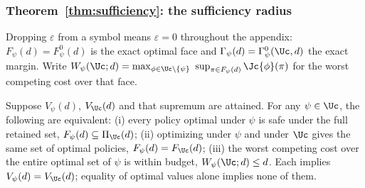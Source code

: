 
\subsubsection*{Theorem~\ref{thm:sufficiency}: the sufficiency radius}
\label{app:proof-eps}\label{app:proof-screen}

Dropping $\varepsilon$ from a symbol means $\varepsilon=0$ throughout the appendix:
$F_\psi(d)=F^0_\psi(d)$ is the exact optimal face and
$\Gamma_\psi(d)=\Gamma^0_\psi(\Uc,d)$ the exact margin. Write
$W_\psi(\Uc;d)=\max_{\phi\in\Uc\setminus\{\psi\}}\ \sup_{\pi\in F_\psi(d)}\Jc{\phi}(\pi)$
for the worst competing cost over that face.

\begin{lemma}
\label{prop:exactface}
Suppose $V_\psi(d)$, $V_{\Uc}(d)$ and that supremum are
attained. For any $\psi\in\Uc$, the following are equivalent:
(i) every policy optimal under $\psi$ is safe under the full retained set,
$F_\psi(d)\subseteq\Pi_{\Uc}(d)$;
(ii) optimizing under $\psi$ and under $\Uc$ gives the same set of optimal
policies, $F_\psi(d)=F_{\Uc}(d)$;
(iii) the worst competing cost over the entire optimal set of $\psi$ is
within budget, $W_\psi(\Uc;d)\le d$.
Each implies $V_\psi(d)=V_{\Uc}(d)$; equality of optimal values alone
implies none of them.
\end{lemma}

